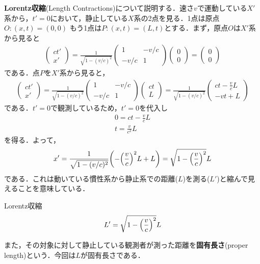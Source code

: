 \documentclass{report}
\begin{document}
  \textbf{Lorentz収縮}(Length Contractions)について説明する．速さ$v$で運動している$X'$系から，$t'=0$において，静止している$X$系の2点を見る．1点は原点$O:(x,t)=(0,0)$
  もう1点は$P:(x,t)=(L,t)$とする．まず，原点$O$は$X'$系から見ると
  \begin{align}
    \begin{pmatrix}
      ct' \\ x'
    \end{pmatrix}
    =
    \frac{1}{\sqrt{1 - (v/c)^2}}
    \begin{pmatrix}
      1 & -v/c\\
      -v/c & 1
    \end{pmatrix}
    \begin{pmatrix}
      0\\0
    \end{pmatrix}
    =
    \begin{pmatrix}
      0\\0
    \end{pmatrix}
  \end{align}
  である．点$P$を$X'$系から見ると，
  \begin{align}
    \begin{pmatrix}
      ct' \\ x'
    \end{pmatrix}
    =
    \frac{1}{\sqrt{1 - (v/c)^2}}
    \begin{pmatrix}
      1 & -v/c\\
      -v/c & 1
    \end{pmatrix}
    \begin{pmatrix}
      ct\\L
    \end{pmatrix}
    =
    \frac{1}{\sqrt{1 - (v/c)^2}}
    \begin{pmatrix}
      ct - \frac{v}{c}L\\-vt + L
    \end{pmatrix}
  \end{align}
  である．$t'=0$で観測しているため，$t'=0$を代入し
  \begin{align}
    0 = ct - \frac{v}{c}L\\
    t = \frac{v}{c^2}L
  \end{align}
  を得る．よって，
  \begin{align}
    x' = \frac{1}{\sqrt{1 - (v/c)^2}} \qty(-\qty(\frac{v}{c})^2 L + L) = \sqrt{1-\qty(\frac{v}{c})^2}L
  \end{align}
  である．これは動いている慣性系から静止系での距離($L$)を測る($L'$)と縮んで見えることを意味している．
  \begin{itembox}[l]{Lorentz収縮}
    \begin{align}
      L' = \sqrt{1-\qty(\frac{v}{c})^2}L
    \end{align}
  \end{itembox}
  また，その対象に対して静止している観測者が測った距離を\textbf{固有長さ}(proper length)という．今回は$L$が固有長さである．
\end{document}
